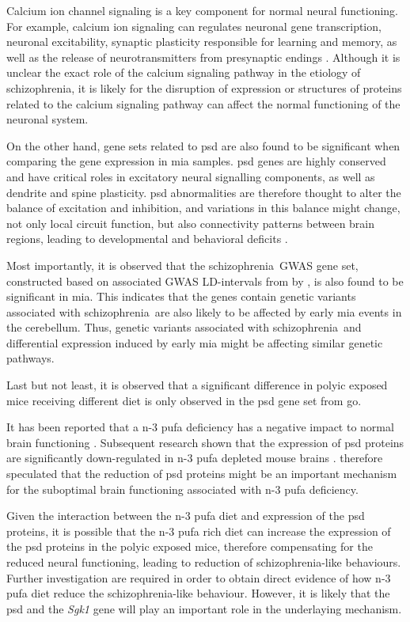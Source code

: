 \documentclass[12pt]{scrbook}
\newcommand*{\scz}{schizophrenia}
\begin{document}
Calcium ion channel signaling is a key component for normal neural functioning.
For example, calcium ion signaling can regulates neuronal gene transcription, neuronal excitability, synaptic plasticity responsible for learning and memory, as well as the release of neurotransmitters from presynaptic endings \citep{Berridge2014}.
Although it is unclear the exact role of the calcium signaling pathway in the etiology of \scz, it is likely for the disruption of expression or structures of proteins related to the calcium signaling pathway can affect the normal functioning of the neuronal system.

On the other hand, gene sets related to \gls{psd} are also found to be significant when comparing the gene expression in \gls{mia} samples. 
\gls{psd} genes are highly conserved and have critical roles in excitatory neural signalling components, as well as dendrite and spine plasticity.
\gls{psd} abnormalities are therefore thought to alter the balance of excitation and inhibition, and variations in this balance might change, not only local circuit function, but also connectivity patterns between brain regions, leading to developmental and behavioral deficits \citep{Cline2005}.

Most importantly, it is observed that the \scz\ \gls{GWAS} gene set, constructed based on associated \gls{GWAS} \gls{LD}-intervals from \citet{Ripke2013} by \citet{purcell2014polygenic}, is also found to be significant in \gls{mia}.
This indicates that the genes contain genetic variants associated with \scz\ are also likely to be affected by early \gls{mia} events in the cerebellum. 
Thus, genetic variants associated with \scz\ and differential expression induced by early \gls{mia} might be affecting similar genetic pathways.

Last but not least, it is observed that a significant difference in \gls{polyic} exposed mice receiving different diet is only observed in the \gls{psd} gene set from \gls{go}.

It has been reported that a n-3 \gls{pufa} deficiency has a negative impact to normal brain functioning \citep{Bazinet2014,Calon2005}.
Subsequent research shown that the expression of \gls{psd} proteins are significantly down-regulated in n-3 \gls{pufa} depleted mouse brains \citep{Sidhu2011}.
\citet{Sidhu2011} therefore speculated that the reduction of \gls{psd} proteins might be an important mechanism for the suboptimal brain functioning associated with n-3 \gls{pufa} deficiency.

Given the interaction between the n-3 \gls{pufa} diet and expression of the \gls{psd} proteins, it is possible that the n-3 \gls{pufa} rich diet can increase the expression of the \gls{psd} proteins in the \gls{polyic} exposed mice, therefore compensating for the reduced neural functioning, leading to reduction of \scz-like behaviours. 
Further investigation are required in order to obtain direct evidence of how n-3 \gls{pufa} diet reduce the \scz-like behaviour.
However, it is likely that the \gls{psd} and the \textit{Sgk1} gene will play an important role in the underlaying mechanism.
\end{document}
